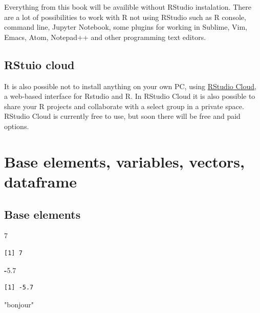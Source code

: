 \documentclass[]{book}
\newenvironment{Shaded}{\begin{snugshade}}{\end{snugshade}}
\newcommand{\DecValTok}[1]{\textcolor[rgb]{0.00,0.00,0.81}{#1}}
\newcommand{\FloatTok}[1]{\textcolor[rgb]{0.00,0.00,0.81}{#1}}
\newcommand{\StringTok}[1]{\textcolor[rgb]{0.31,0.60,0.02}{#1}}
\newcommand{\OperatorTok}[1]{\textcolor[rgb]{0.81,0.36,0.00}{\textbf{#1}}}
\theoremstyle{definition}
\theoremstyle{definition}
\theoremstyle{definition}
\theoremstyle{remark}
\begin{document}
Everything from this book will be availible without RStudio instalation.
There are a lot of possibilities to work with R not using RStudio such
as R console, command line, Jupyter Notebook, some plugins for working
in Sublime, Vim, Emacs, Atom, Notepad++ and other programming text
editors.

\subsection{RStuio cloud}\label{rstuio-cloud}

It is also possible not to install anything on your own PC, using
\href{https://rstudio.cloud/}{RStudio Cloud}, a web-based interface for
Rstudio and R. In RStudio Cloud it is also possible to share your R
projects and collaborate with a select group in a private space. RStudio
Cloud is currently free to use, but soon there will be free and paid
options.

\section{Base elements, variables, vectors,
dataframe}\label{base-elements-variables-vectors-dataframe}

\subsection{Base elements}\label{base-elements}

\begin{Shaded}
\begin{Highlighting}[]
\DecValTok{7}
\end{Highlighting}
\end{Shaded}

\begin{verbatim}
[1] 7
\end{verbatim}

\begin{Shaded}
\begin{Highlighting}[]
\OperatorTok{-}\FloatTok{5.7}
\end{Highlighting}
\end{Shaded}

\begin{verbatim}
[1] -5.7
\end{verbatim}

\begin{Shaded}
\begin{Highlighting}[]
\StringTok{"bonjour"}
\end{Highlighting}
\end{Shaded}
\end{document}
